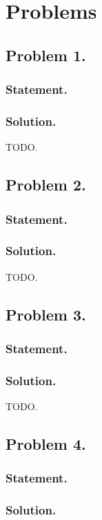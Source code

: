 \section{Problems}

\subsection{Problem 1.}
\subsubsection{Statement.}
\subsubsection{Solution.}

TODO.
\subsection{Problem 2.}
\subsubsection{Statement.}
\subsubsection{Solution.}

TODO.
\subsection{Problem 3.}
\subsubsection{Statement.}
\subsubsection{Solution.}

TODO.
\subsection{Problem 4.}
\subsubsection{Statement.}
\subsubsection{Solution.}


